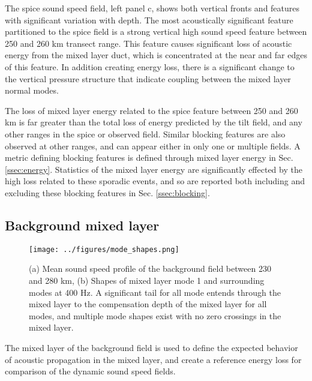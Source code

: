 \documentclass[preprint,NumberedRefs]{JASA}
\begin{document}
The spice sound speed field, left panel c, shows both vertical fronts and features with significant variation with depth. The most acoustically significant feature partitioned to the spice field is a strong vertical high sound speed feature between 250 and 260 km transect range. This feature causes significant loss of acoustic energy from the mixed layer duct, which is concentrated at the near and far edges of this feature. In addition creating energy loss, there is a significant change to the vertical pressure structure that indicate coupling between the mixed layer normal modes.

The loss of mixed layer energy related to the spice feature between 250 and 260 km is far greater than the total loss of energy predicted by the tilt field, and any other ranges in the spice or observed field. Similar blocking features are also observed at other ranges, and can appear either in only one or multiple fields. A metric defining blocking features is defined through mixed layer energy in Sec. \ref{ssec:energy}. Statistics of the mixed layer energy are significantly effected by the high loss related to these sporadic events, and so are reported both including and excluding these blocking features in Sec. \ref{ssec:blocking}.

\subsection{Background mixed layer}\label{ssec:modes}
\begin{figure}
\texttt{[image: ../figures/mode\_shapes.png]}
    \caption{\label{fig:bg_modes}{(a) Mean sound speed profile of the background field between 230 and 280 km, (b) Shapes of mixed layer mode 1 and surrounding modes at 400 Hz. A significant tail for all mode entends through the mixed layer to the compensation depth of the mixed layer for all modes, and multiple mode shapes exist with no zero crossings in the mixed layer.}}
\end{figure}
The mixed layer of the background field is used to define the expected behavior of acoustic propagation in the mixed layer, and create a reference energy loss for comparison of the dynamic sound speed fields.
\end{document}
